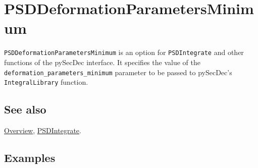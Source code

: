 \documentclass[../FeynHelpersManual.tex]{subfiles}
\begin{document}
\hypertarget{psddeformationparametersminimum}{
\section{PSDDeformationParametersMinimum}\label{psddeformationparametersminimum}}

\texttt{PSDDeformationParametersMinimum} is an option for
\texttt{PSDIntegrate} and other functions of the pySecDec interface. It
specifies the value of the \texttt{deformation_parameters_minimum}
parameter to be passed to pySecDec's \texttt{IntegralLibrary} function.

\subsection{See also}

\hyperlink{toc}{Overview}, \hyperlink{psdintegrate}{PSDIntegrate}.

\subsection{Examples}
\end{document}
